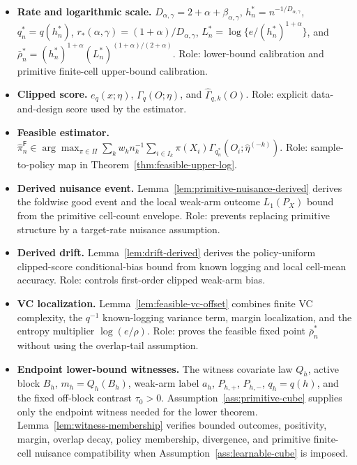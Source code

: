 \documentclass[11pt]{article}
\theoremstyle{definition}
\theoremstyle{plain}
\theoremstyle{remark}
\begin{document}
\begin{itemize}[leftmargin=*]
\(\beta_{\alpha,\gamma}=0\), and
\(q(h)=h^{\beta_{\alpha,\gamma}}\) otherwise.  Role: keeps the clipping level
inside \((0,1/2]\), including the \(\alpha=0,\gamma>0\) case.
\item \textbf{Rate and logarithmic scale.}
\(D_{\alpha,\gamma}=2+\alpha+\beta_{\alpha,\gamma}\),
\(h_n^*=n^{-1/D_{\alpha,\gamma}}\),
\(q_n^*=q(h_n^*)\),
\(r_*(\alpha,\gamma)=(1+\alpha)/D_{\alpha,\gamma}\),
\(L_n^*=\log\{e/(h_n^*)^{1+\alpha}\}\), and
\(\bar\rho_n^*=(h_n^*)^{1+\alpha}(L_n^*)^{(1+\alpha)/(2+\alpha)}\).
Role: lower-bound calibration and primitive finite-cell upper-bound
calibration.
\item \textbf{Clipped score.}  \(e_q(x;\eta)\), \(\Gamma_q(O;\eta)\), and
\(\widehat\Gamma_{q,k}(O)\).  Role: explicit data-and-design score used by
the estimator.
\item \textbf{Feasible estimator.}
\(\widehat\pi_n^{\mathsf F}\in\arg\max_{\pi\in\Pi}\sum_k w_k n_k^{-1}
\sum_{i\in I_k}\pi(X_i)\Gamma_{q_n^*}(O_i;\widehat\eta^{(-k)})\).  Role:
sample-to-policy map in Theorem~\ref{thm:feasible-upper-log}.
\item \textbf{Derived nuisance event.}
Lemma~\ref{lem:primitive-nuisance-derived} derives the foldwise good event
and the local weak-arm outcome \(L_1(P_X)\) bound from the primitive
cell-count envelope.  Role: prevents replacing primitive structure by a
target-rate nuisance assumption.
\item \textbf{Derived drift.}  Lemma~\ref{lem:drift-derived} derives the
policy-uniform clipped-score conditional-bias bound from known logging and
local cell-mean accuracy.  Role: controls first-order clipped weak-arm bias.
\item \textbf{VC localization.}  Lemma~\ref{lem:feasible-vc-offset} combines
finite VC complexity, the \(q^{-1}\) known-logging variance term, margin
localization, and the entropy multiplier \(\log(e/\rho)\).  Role: proves the
feasible fixed point \(\bar\rho_n^*\) without using the overlap-tail
assumption.
\item \textbf{Endpoint lower-bound witnesses.}  The witness covariate law
\(Q_h\), active block \(B_h\), \(m_h=Q_h(B_h)\), weak-arm label \(a_h\),
\(P_{h,+}\), \(P_{h,-}\), \(q_h=q(h)\), and the fixed off-block contrast
\(\tau_0>0\).  Assumption~\ref{ass:primitive-cube} supplies only the endpoint
witness needed for the lower theorem.  Lemma~\ref{lem:witness-membership}
verifies bounded outcomes, positivity, margin, overlap decay, policy
membership, divergence, and primitive finite-cell nuisance compatibility when
Assumption~\ref{ass:learnable-cube} is imposed.

\end{itemize}
\end{document}
